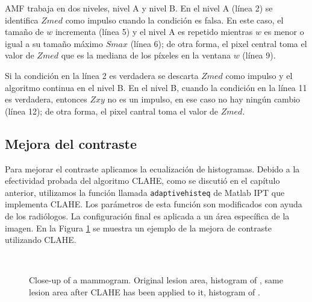 AMF trabaja en dos niveles, nivel A y nivel B. En el nivel A (línea 2) se
identifica $Zmed$ como impulso cuando la condición es falsa. En este caso, el
tamaño de $w$ incrementa (línea 5) y el nivel A es repetido mientras $w$ es
menor o igual a su tamaño máximo $Smax$ (línea 6); de otra forma, el pixel
central toma el valor de $Zmed$ que es la mediana de los píxeles en la ventana
$w$ (línea 9).

Si la condición en la línea 2 es verdadera se descarta $Zmed$ como impulso y el
algoritmo continua en el nivel B. En el nivel B, cuando la condición en la
línea 11 es verdadera, entonces $Zxy$ no es un impulso, en ese caso no hay
ningún cambio (línea 12); de otra forma, el pixel cantral toma el valor de
$Zmed$.

\subsection{Mejora del contraste}

Para mejorar el contraste aplicamos la ecualización de histogramas. Debido a la
efectividad probada del algoritmo CLAHE, como se discutió en el capítulo
anterior, utilizamos la función llamada \texttt{adaptivehisteq} de Matlab IPT
que implementa CLAHE. Los parámetros de esta función son modificados con ayuda
de los radiólogos. La configuración final es aplicada a un área específica de
la imagen. En la Figura \ref{img:clahe} se muestra un ejemplo de la mejora de
contraste utilizando CLAHE.

\begin{figure}[h!]
  \begin{center}
    \hspace{12pt}
    \\
    \hspace{12pt}
  \end{center} 

  \caption{Close-up of a mammogram. \protect{} Original lesion area,
  \protect{} histogram of \protect{}, \protect{} same lesion
  area after CLAHE has been applied to it, \protect{} histogram of
  \protect{}.} 

  \label{img:clahe} 
\end{figure}

